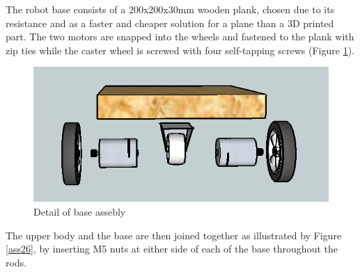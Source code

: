 
The robot base consists of a 200x200x30mm wooden plank, chosen due to its resistance and as a faster and cheaper solution for a plane than a 3D printed part. The two motors are snapped into the wheels and fastened to the plank with zip ties while the caster wheel is screwed with four self-tapping screws (Figure \ref{ass24}).\\

	\begin{figure}[H]
			\centering
			\includegraphics[scale=0.5]{images/Assembly/24.png}
			\caption{Detail of base assebly  }
			\label{ass24}
	\end{figure}
	\bigskip





The upper body and the base are then joined together as illustrated by Figure \ref{ass26}, by inserting M5 nuts at either side of each of the base throughout the rods.\\

